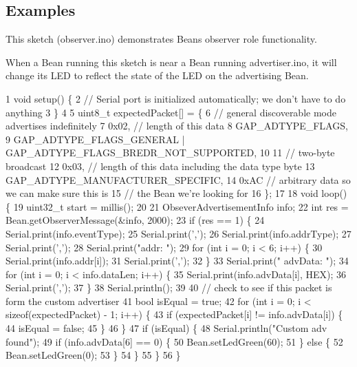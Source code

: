 \subsection*{Examples}

This sketch (observer.\+ino) demonstrates Bean\textquotesingle{}s observer role functionality.

When a Bean running this sketch is near a Bean running advertiser.\+ino, it will change its L\+E\+D to reflect the state of the L\+E\+D on the advertising Bean.


\begin{DoxyCodeInclude}
1 void setup() \{
2   // Serial port is initialized automatically; we don't have to do anything
3 \}
4 
5 uint8\_t expectedPacket[] = \{
6     // general discoverable mode advertises indefinitely
7     0x02,  // length of this data
8     GAP\_ADTYPE\_FLAGS,
9     GAP\_ADTYPE\_FLAGS\_GENERAL | GAP\_ADTYPE\_FLAGS\_BREDR\_NOT\_SUPPORTED,
10 
11     // two-byte broadcast
12     0x03,  // length of this data including the data type byte
13     GAP\_ADTYPE\_MANUFACTURER\_SPECIFIC,
14     0xAC  // arbitrary data so we can make sure this is
15           // the Bean we're looking for
16 \};
17 
18 void loop() \{
19   uint32\_t start = millis();
20 
21   ObseverAdvertisementInfo info;
22   int res = Bean.getObserverMessage(&info, 2000);
23   if (res == 1) \{
24     Serial.print(info.eventType);
25     Serial.print(',');
26     Serial.print(info.addrType);
27     Serial.print(',');
28     Serial.print("addr: ");
29     for (int i = 0; i < 6; i++) \{
30       Serial.print(info.addr[i]);
31       Serial.print(',');
32     \}
33     Serial.print("  advData: ");
34     for (int i = 0; i < info.dataLen; i++) \{
35       Serial.print(info.advData[i], HEX);
36       Serial.print(',');
37     \}
38     Serial.println();
39 
40     // check to see if this packet is form the custom advertiser
41     bool isEqual = true;
42     for (int i = 0; i < sizeof(expectedPacket) - 1; i++) \{
43       if (expectedPacket[i] != info.advData[i]) \{
44         isEqual = false;
45       \}
46     \}
47     if (isEqual) \{
48       Serial.println("Custom adv found");
49       if (info.advData[6] == 0) \{
50         Bean.setLedGreen(60);
51       \} else \{
52         Bean.setLedGreen(0);
53       \}
54     \}
55   \}
56 \}
\end{DoxyCodeInclude}
 \hypertarget{class_bean_class_ae2547ba8f4b67a9ac774ce6d89b14dcb}{}
